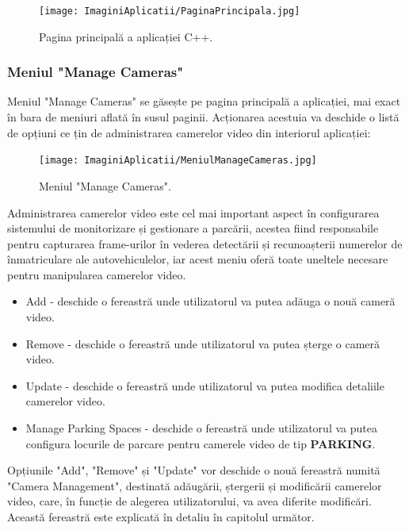 \documentclass[12pt]{article}
\begin{document}
\begin{figure}[H]
  \centering
  \texttt{[image: ImaginiAplicatii/PaginaPrincipala.jpg]}
  \caption{Pagina principal\u{a} a aplicației C++.}
  \label{fig:aplicatie_pagina_principala}
\end{figure}

\subsubsection{Meniul "Manage Cameras"}

Meniul "Manage Cameras" se g\u{a}sește pe pagina principal\u{a} a aplicației, mai exact \^{i}n bara de meniuri aflat\u{a} \^{i}n susul paginii. Acționarea acestuia va deschide o list\u{a} de opțiuni ce țin de administrarea camerelor video din interiorul aplicației:

\begin{figure}[H]
  \centering
  \texttt{[image: ImaginiAplicatii/MeniulManageCameras.jpg]}
  \caption{Meniul "Manage Cameras".}
  \label{fig:aplicatie_meniul_manage_cameras}
\end{figure}

Administrarea camerelor video este cel mai important aspect \^{i}n configurarea sistemului de monitorizare și gestionare a parc\u{a}rii, acestea fiind responsabile pentru capturarea frame-urilor \^{i}n vederea detect\u{a}rii și recunoașterii numerelor de \^{i}nmatriculare ale autovehiculelor, iar acest meniu ofer\u{a} toate uneltele necesare pentru manipularea camerelor video.

\begin{itemize}
    \item Add - deschide o fereastr\u{a} unde utilizatorul va putea ad\u{a}uga o nou\u{a} camer\u{a} video.
    \item Remove - deschide o fereastr\u{a} unde utilizatorul va putea șterge o camer\u{a} video.
    \item Update - deschide o fereastr\u{a} unde utilizatorul va putea modifica detaliile camerelor video.
    \item Manage Parking Spaces - deschide o fereastr\u{a} unde utilizatorul va putea configura locurile de parcare pentru camerele video de tip \textbf{PARKING}.
\end{itemize}

Opțiunile "Add", "Remove" și "Update" vor deschide o nou\u{a} fereastr\u{a} numit\u{a} "Camera Management", destinat\u{a} ad\u{a}ug\u{a}rii, ștergerii și modific\u{a}rii camerelor video, care, \^{i}n funcție de alegerea utilizatorului, va avea diferite modific\u{a}ri. Aceast\u{a} fereastr\u{a} este explicat\u{a} \^{i}n detaliu \^{i}n capitolul urm\u{a}tor.
\end{document}
